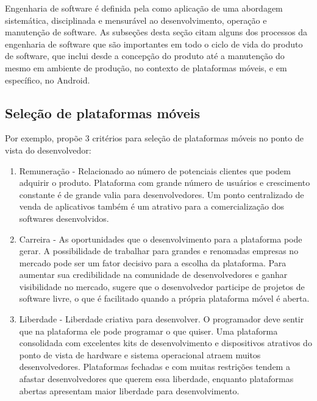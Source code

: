 Engenharia de software é definida pela \cite{swebok} como aplicação de uma abordagem sistemática, disciplinada e mensurável ao desenvolvimento, operação e manutenção de software. As subseções desta seção citam alguns dos processos da engenharia de software que são importantes em todo o ciclo de vida do produto de software, que inclui desde a concepção do produto até a manutenção do mesmo em ambiente de produção, no contexto de plataformas móveis, e em específico, no Android.

\subsection{Seleção de plataformas móveis}

 Por exemplo, propõe 3 critérios para seleção de plataformas móveis no ponto de vista do desenvolvedor:
\begin{enumerate}
\item Remuneração - Relacionado ao número de potenciais clientes que podem adquirir o produto. Plataforma com grande número de usuários e crescimento constante é de grande valia para desenvolvedores. Um ponto centralizado de venda de aplicativos também é um atrativo para a comercialização dos softwares desenvolvidos.
\item Carreira - As oportunidades que o desenvolvimento para a plataforma pode gerar. A possibilidade de trabalhar para grandes e renomadas empresas no mercado pode ser um fator decisivo para a escolha da plataforma. Para aumentar sua credibilidade na comunidade de desenvolvedores e ganhar visibilidade no mercado,  sugere que o desenvolvedor participe de projetos de software livre, o que é facilitado quando a própria plataforma móvel é aberta.
\item Liberdade - Liberdade criativa para desenvolver. O programador deve sentir que na plataforma ele pode programar o que quiser. Uma plataforma consolidada com excelentes kits de desenvolvimento e dispositivos atrativos do ponto de vista de hardware e sistema operacional atraem muitos desenvolvedores. Plataformas fechadas e com muitas restrições tendem a afastar desenvolvedores que querem essa liberdade, enquanto plataformas abertas apresentam maior liberdade para desenvolvimento.
\end{enumerate}

